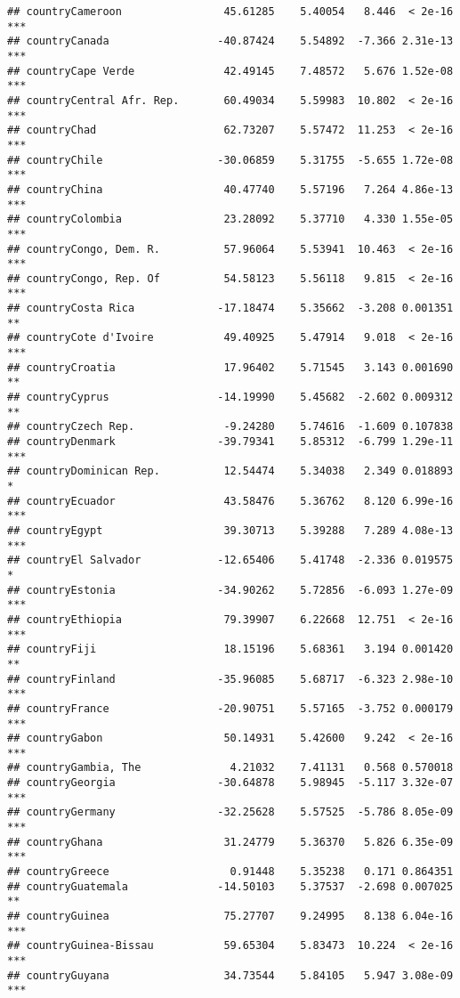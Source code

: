 \documentclass[
  11pt,
]{article}
\begin{document}
\begin{verbatim}
## countryCameroon                45.61285    5.40054   8.446  < 2e-16 ***
## countryCanada                 -40.87424    5.54892  -7.366 2.31e-13 ***
## countryCape Verde              42.49145    7.48572   5.676 1.52e-08 ***
## countryCentral Afr. Rep.       60.49034    5.59983  10.802  < 2e-16 ***
## countryChad                    62.73207    5.57472  11.253  < 2e-16 ***
## countryChile                  -30.06859    5.31755  -5.655 1.72e-08 ***
## countryChina                   40.47740    5.57196   7.264 4.86e-13 ***
## countryColombia                23.28092    5.37710   4.330 1.55e-05 ***
## countryCongo, Dem. R.          57.96064    5.53941  10.463  < 2e-16 ***
## countryCongo, Rep. Of          54.58123    5.56118   9.815  < 2e-16 ***
## countryCosta Rica             -17.18474    5.35662  -3.208 0.001351 ** 
## countryCote d'Ivoire           49.40925    5.47914   9.018  < 2e-16 ***
## countryCroatia                 17.96402    5.71545   3.143 0.001690 ** 
## countryCyprus                 -14.19990    5.45682  -2.602 0.009312 ** 
## countryCzech Rep.              -9.24280    5.74616  -1.609 0.107838    
## countryDenmark                -39.79341    5.85312  -6.799 1.29e-11 ***
## countryDominican Rep.          12.54474    5.34038   2.349 0.018893 *  
## countryEcuador                 43.58476    5.36762   8.120 6.99e-16 ***
## countryEgypt                   39.30713    5.39288   7.289 4.08e-13 ***
## countryEl Salvador            -12.65406    5.41748  -2.336 0.019575 *  
## countryEstonia                -34.90262    5.72856  -6.093 1.27e-09 ***
## countryEthiopia                79.39907    6.22668  12.751  < 2e-16 ***
## countryFiji                    18.15196    5.68361   3.194 0.001420 ** 
## countryFinland                -35.96085    5.68717  -6.323 2.98e-10 ***
## countryFrance                 -20.90751    5.57165  -3.752 0.000179 ***
## countryGabon                   50.14931    5.42600   9.242  < 2e-16 ***
## countryGambia, The              4.21032    7.41131   0.568 0.570018    
## countryGeorgia                -30.64878    5.98945  -5.117 3.32e-07 ***
## countryGermany                -32.25628    5.57525  -5.786 8.05e-09 ***
## countryGhana                   31.24779    5.36370   5.826 6.35e-09 ***
## countryGreece                   0.91448    5.35238   0.171 0.864351    
## countryGuatemala              -14.50103    5.37537  -2.698 0.007025 ** 
## countryGuinea                  75.27707    9.24995   8.138 6.04e-16 ***
## countryGuinea-Bissau           59.65304    5.83473  10.224  < 2e-16 ***
## countryGuyana                  34.73544    5.84105   5.947 3.08e-09 ***

\end{verbatim}
\end{document}
